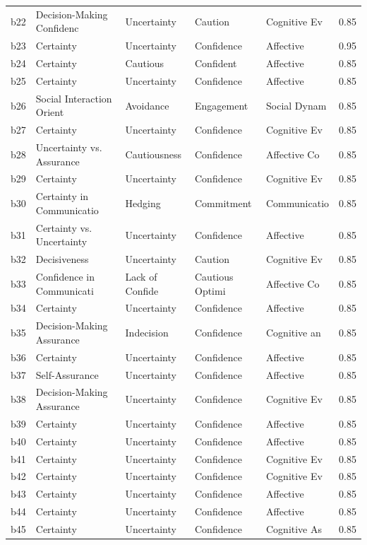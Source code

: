 \begin{table}[H]
\begin{tabular}{|l|l|l|l|l|r|}
b22 & Decision-Making Confidenc & Uncertainty & Caution & Cognitive Ev & 0.85 \\
b23 & Certainty & Uncertainty & Confidence & Affective & 0.95 \\
b24 & Certainty & Cautious & Confident & Affective & 0.85 \\
b25 & Certainty & Uncertainty & Confidence & Affective & 0.85 \\
b26 & Social Interaction Orient & Avoidance & Engagement & Social Dynam & 0.85 \\
b27 & Certainty & Uncertainty & Confidence & Cognitive Ev & 0.85 \\
b28 & Uncertainty vs. Assurance & Cautiousness & Confidence & Affective Co & 0.85 \\
b29 & Certainty & Uncertainty & Confidence & Cognitive Ev & 0.85 \\
b30 & Certainty in Communicatio & Hedging & Commitment & Communicatio & 0.85 \\
b31 & Certainty vs. Uncertainty & Uncertainty & Confidence & Affective & 0.85 \\
b32 & Decisiveness & Uncertainty & Caution & Cognitive Ev & 0.85 \\
b33 & Confidence in Communicati & Lack of Confide & Cautious Optimi & Affective Co & 0.85 \\
b34 & Certainty & Uncertainty & Confidence & Affective & 0.85 \\
b35 & Decision-Making Assurance & Indecision & Confidence & Cognitive an & 0.85 \\
b36 & Certainty & Uncertainty & Confidence & Affective & 0.85 \\
b37 & Self-Assurance & Uncertainty & Confidence & Affective & 0.85 \\
b38 & Decision-Making Assurance & Uncertainty & Confidence & Cognitive Ev & 0.85 \\
b39 & Certainty & Uncertainty & Confidence & Affective & 0.85 \\
b40 & Certainty & Uncertainty & Confidence & Affective & 0.85 \\
b41 & Certainty & Uncertainty & Confidence & Cognitive Ev & 0.85 \\
b42 & Certainty & Uncertainty & Confidence & Cognitive Ev & 0.85 \\
b43 & Certainty & Uncertainty & Confidence & Affective & 0.85 \\
b44 & Certainty & Uncertainty & Confidence & Affective & 0.85 \\
b45 & Certainty & Uncertainty & Confidence & Cognitive As & 0.85 \\

\end{tabular}
\end{table}
